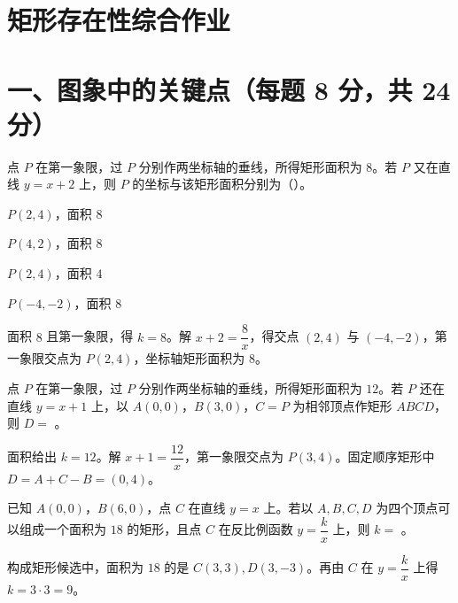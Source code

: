 \documentclass{exam-zh}
\begin{document}
\section*{矩形存在性综合作业}

\section*{一、图象中的关键点（每题 8 分，共 24 分）}


\begin{question}[points=8]
  点 $P$ 在第一象限，过 $P$ 分别作两坐标轴的垂线，所得矩形面积为 $8$。若 $P$ 又在直线 $y=x+2$ 上，则 $P$ 的坐标与该矩形面积分别为（\quad）。

  \begin{choices}
    \item $P(2,4)$，面积 $8$
    \item $P(4,2)$，面积 $8$
    \item $P(2,4)$，面积 $4$
    \item $P(-4,-2)$，面积 $8$
  \end{choices}
  \paren[A]
  \begin{solutionblock}
    面积 $8$ 且第一象限，得 $k=8$。解 $x+2=\dfrac8x$，得交点 $(2,4)$ 与 $(-4,-2)$，第一象限交点为 $P(2,4)$，坐标轴矩形面积为 $8$。
  \end{solutionblock}
\end{question}



\begin{question}[points=8]
  点 $P$ 在第一象限，过 $P$ 分别作两坐标轴的垂线，所得矩形面积为 $12$。若 $P$ 还在直线 $y=x+1$ 上，以 $A(0,0)$，$B(3,0)$，$C=P$ 为相邻顶点作矩形 $ABCD$，则 $D=$ \underline{\hspace{2cm}}。

  \paren[$(0,4)$]
  \begin{solutionblock}
    面积给出 $k=12$。解 $x+1=\dfrac{12}{x}$，第一象限交点为 $P(3,4)$。固定顺序矩形中 $D=A+C-B=(0,4)$。
  \end{solutionblock}
\end{question}



\begin{question}[points=8]
  已知 $A(0,0)$，$B(6,0)$，点 $C$ 在直线 $y=x$ 上。若以 $A,B,C,D$ 为四个顶点可以组成一个面积为 $18$ 的矩形，且点 $C$ 在反比例函数 $y=\dfrac{k}{x}$ 上，则 $k=$ \underline{\hspace{2cm}}。

  \paren[$9$]
  \begin{solutionblock}
    构成矩形候选中，面积为 $18$ 的是 $C(3,3),D(3,-3)$。再由 $C$ 在 $y=\dfrac{k}{x}$ 上得 $k=3\cdot3=9$。
  \end{solutionblock}
\end{question}
\end{document}
